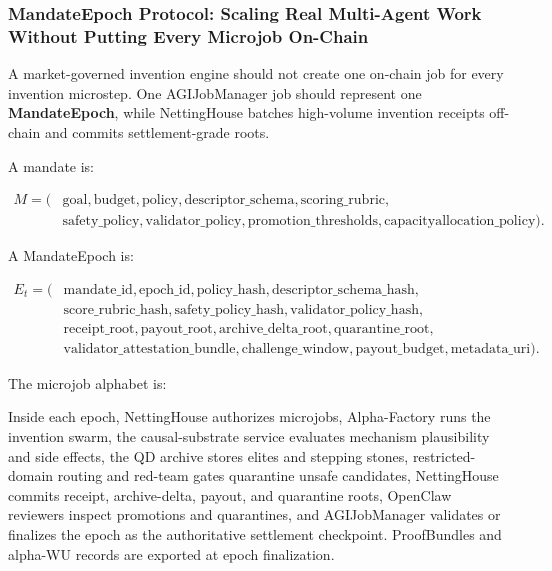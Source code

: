 \subsubsection{MandateEpoch Protocol: Scaling Real Multi-Agent Work
Without Putting Every Microjob
On-Chain}\label{mandateepoch-protocol-scaling-real-multi-agent-work-without-putting-every-microjob-on-chain}

A market-governed invention engine should not create one on-chain job
for every invention microstep. One AGIJobManager job should represent
one \textbf{MandateEpoch}, while NettingHouse batches high-volume
invention receipts off-chain and commits settlement-grade roots.

A mandate is:

\[
\begin{aligned}
M = (&\mathrm{goal}, \mathrm{budget}, \mathrm{policy},
\mathrm{descriptor\_schema}, \mathrm{scoring\_rubric},\\
&\mathrm{safety\_policy}, \mathrm{validator\_policy},
\mathrm{promotion\_thresholds}, \mathrm{capacity allocation\_policy}).
\end{aligned}
\]

A MandateEpoch is:

\[
\begin{aligned}
E_t = (&\mathrm{mandate\_id}, \mathrm{epoch\_id}, \mathrm{policy\_hash},
\mathrm{descriptor\_schema\_hash},\\
&\mathrm{score\_rubric\_hash}, \mathrm{safety\_policy\_hash},
\mathrm{validator\_policy\_hash},\\
&\mathrm{receipt\_root}, \mathrm{payout\_root},
\mathrm{archive\_delta\_root}, \mathrm{quarantine\_root},\\
&\mathrm{validator\_attestation\_bundle}, \mathrm{challenge\_window},
\mathrm{payout\_budget}, \mathrm{metadata\_uri}).
\end{aligned}
\]

The microjob alphabet is:

\begin{Shaded}
\begin{Highlighting}[]
\end{Highlighting}
\end{Shaded}

Inside each epoch, NettingHouse authorizes microjobs, Alpha-Factory runs
the invention swarm, the causal-substrate service evaluates mechanism
plausibility and side effects, the QD archive stores elites and stepping
stones, restricted-domain routing and red-team gates quarantine unsafe
candidates, NettingHouse commits receipt, archive-delta, payout, and
quarantine roots, OpenClaw reviewers inspect promotions and quarantines,
and AGIJobManager validates or finalizes the epoch as the authoritative
settlement checkpoint. ProofBundles and alpha-WU records are exported at
epoch finalization.

